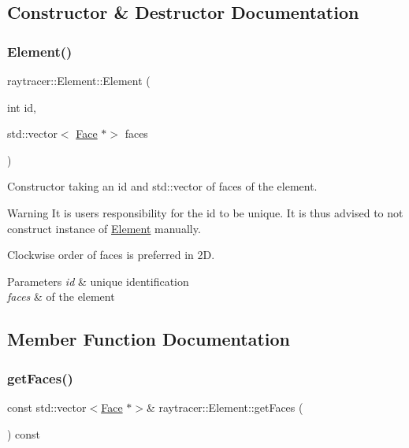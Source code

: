 \subsection{Constructor \& Destructor Documentation}
\mbox{\label{classraytracer_1_1Element_a70169ab8330ac32971e0925ae4ad2fd9}} 
\subsubsection{\texorpdfstring{Element()}{Element()}}
{\footnotesize\ttfamily raytracer\+::\+Element\+::\+Element (\begin{DoxyParamCaption}\item[{int}]{id,  }\item[{std\+::vector$<$ \hyperlink{classraytracer_1_1Face}{Face} $\ast$$>$}]{faces }\end{DoxyParamCaption})\hspace{0.3cm}{\ttfamily [explicit]}}



Constructor taking an id and std\+::vector of faces of the element. 

\begin{DoxyWarning}{Warning}
It is users responsibility for the id to be unique. It is thus advised to not construct instance of \hyperlink{classraytracer_1_1Element}{Element} manually.
\end{DoxyWarning}
Clockwise order of faces is preferred in 2D. 
\begin{DoxyParams}{Parameters}
{\em id} & unique identification \\
\hline
{\em faces} & of the element \\
\hline
\end{DoxyParams}


\subsection{Member Function Documentation}
\mbox{\label{classraytracer_1_1Element_a46d4135d6ef7fd7c34656aa90f35b2ed}} 
\subsubsection{\texorpdfstring{get\+Faces()}{getFaces()}}
{\footnotesize\ttfamily const std\+::vector$<$\hyperlink{classraytracer_1_1Face}{Face} $\ast$$>$\& raytracer\+::\+Element\+::get\+Faces (\begin{DoxyParamCaption}{ }\end{DoxyParamCaption}) const}



